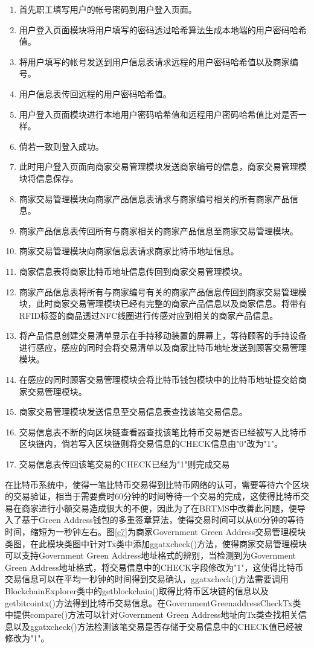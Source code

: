 	\begin{enumerate}
	\item 首先职工填写用户的帐号密码到用户登入页面。
	\item 用户登入页面模块将用户填写的密码透过哈希算法生成本地端的用户密码哈希值。
	\item 将用户填写的帐号发送到用户信息表请求远程的用户密码哈希值以及商家编号。
	\item 用户信息表传回远程的用户密码哈希值。
	\item 用户登入页面模块进行本地用户密码哈希值和远程用户密码哈希值比对是否一样。
	\item 倘若一致则登入成功。
	\item 此时用户登入页面向商家交易管理模块发送商家编号的信息，商家交易管理模块将信息保存。
	\item 商家交易管理模块向商家产品信息表请求与商家编号相关的所有商家产品信息。
	\item 商家产品信息表传回所有与商家相关的商家产品信息至商家交易管理模块。
	\item 商家交易管理模块向商家信息表请求商家比特币地址信息。
	\item 商家信息表将商家比特币地址信息传回到商家交易管理模块。
	\item 商家产品信息表将所有与商家编号有关的商家产品信息传回到商家交易管理模块，此时商家交易管理模块已经有完整的商家产品信息以及商家信息。将带有RFID标签的商品透过NFC线圈进行传感对应到相关的商家产品信息。
	\item 将产品信息创建交易清单显示在手持移动装置的屏幕上，等待顾客的手持设备进行感应，感应的同时会将交易清单以及商家比特币地址发送到顾客交易管理模块。

	\item 在感应的同时顾客交易管理模块会将比特币钱包模块中的比特币地址提交给商家交易管理模块。
	\item 商家交易管理模块发送信息至交易信息表查找该笔交易信息。
	\item 交易信息表不断的向区块链查看器查找该笔比特币交易是否已经被写入比特币区块链内，倘若写入区块链则将交易信息的CHECK信息由"0"改为"1"。
	\item 交易信息表传回该笔交易的CHECK已经为"1"则完成交易
	
	\end{enumerate}

	在比特币系统中，使得一笔比特币交易得到比特币网络的认可，需要等待六个区块的交易验证，相当于需要费时60分钟的时间等待一个交易的完成，这使得比特币交易在商家进行小额交易造成很大的不便，因此为了在BRTMS中改善此问题，便导入了基于Green Address钱包的多重签章算法，使得交易时间可以从60分钟的等待时间，缩短为一秒钟左右。图\ref{c7}为商家Government Green Address交易管理模块类图，在此模块类图中针对Tx类中添加ggatxcheck()方法，使得商家交易管理模块可以支持Government Green Address地址格式的辨别，当检测到为Government Green Address地址格式，将交易信息中的CHECK字段修改为"1"，这使得比特币交易信息可以在平均一秒钟的时间得到交易确认，ggatxcheck()方法需要调用BlockchainExplorer类中的getblockchain()取得比特币区块链的信息以及getbitcointx()方法得到比特币交易信息。在GovernmentGreenaddressCheckTx类中提供compare()方法可以针对Government Green Address地址向Tx类查找相关信息以及ggatxcheck()方法检测该笔交易是否存储于交易信息中的CHECK值已经被修改为"1"。

